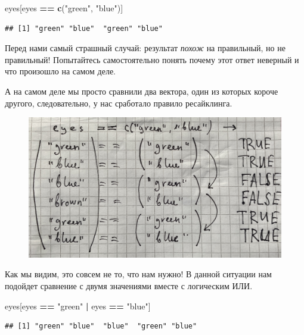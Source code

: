 \documentclass[]{book}
\newenvironment{Shaded}{\begin{snugshade}}{\end{snugshade}}
\newcommand{\KeywordTok}[1]{\textcolor[rgb]{0.13,0.29,0.53}{\textbf{#1}}}
\newcommand{\StringTok}[1]{\textcolor[rgb]{0.31,0.60,0.02}{#1}}
\newcommand{\OperatorTok}[1]{\textcolor[rgb]{0.81,0.36,0.00}{\textbf{#1}}}
\newcommand{\NormalTok}[1]{#1}
\begin{document}
\begin{Shaded}
\begin{Highlighting}[]
\NormalTok{eyes[eyes }\OperatorTok{==}\StringTok{ }\KeywordTok{c}\NormalTok{(}\StringTok{"green"}\NormalTok{, }\StringTok{"blue"}\NormalTok{)]}
\end{Highlighting}
\end{Shaded}

\begin{verbatim}
## [1] "green" "blue"  "green" "blue"
\end{verbatim}

Перед нами самый страшный случай: результат \emph{похож} на правильный,
но не правильный! Попытайтесь самостоятельно понять почему этот ответ
неверный и что произошло на самом деле.

А на самом деле мы просто сравнили два вектора, один из которых короче
другого, следовательно, у нас сработало правило ресайклинга.

\begin{figure}
\centering
\includegraphics{images/logical_vectors_recycling.jpg}
\caption{}
\end{figure}

Как мы видим, это совсем не то, что нам нужно! В данной ситуации нам
подойдет сравнение с двумя значениями вместе с логическим ИЛИ.

\begin{Shaded}
\begin{Highlighting}[]
\NormalTok{eyes[eyes }\OperatorTok{==}\StringTok{ "green"} \OperatorTok{|}\StringTok{ }\NormalTok{eyes }\OperatorTok{==}\StringTok{ "blue"}\NormalTok{]}
\end{Highlighting}
\end{Shaded}

\begin{verbatim}
## [1] "green" "blue"  "blue"  "green" "blue"
\end{verbatim}
\end{document}
